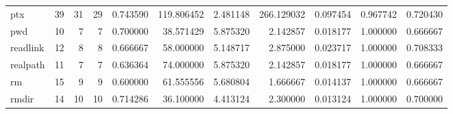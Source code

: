 \begin{longtable}{lrrrrrrrrrr}
ptx       &                                      39 &                 31 &                                29 &                                   0.743590 &                             119.806452 &                                     2.481148 &                        266.129032 &                                0.097454 &                           0.967742 &                                           0.720430 \\
pwd       &                                      10 &                  7 &                                 7 &                                   0.700000 &                              38.571429 &                                     5.875320 &                          2.142857 &                                0.018177 &                           1.000000 &                                           0.666667 \\
readlink  &                                      12 &                  8 &                                 8 &                                   0.666667 &                              58.000000 &                                     5.148717 &                          2.875000 &                                0.023717 &                           1.000000 &                                           0.708333 \\
realpath  &                                      11 &                  7 &                                 7 &                                   0.636364 &                              74.000000 &                                     5.875320 &                          2.142857 &                                0.018177 &                           1.000000 &                                           0.666667 \\
rm        &                                      15 &                  9 &                                 9 &                                   0.600000 &                              61.555556 &                                     5.680804 &                          1.666667 &                                0.014137 &                           1.000000 &                                           0.666667 \\
rmdir     &                                      14 &                 10 &                                10 &                                   0.714286 &                              36.100000 &                                     4.413124 &                          2.300000 &                                0.013124 &                           1.000000 &                                           0.700000 \\

\end{longtable}
